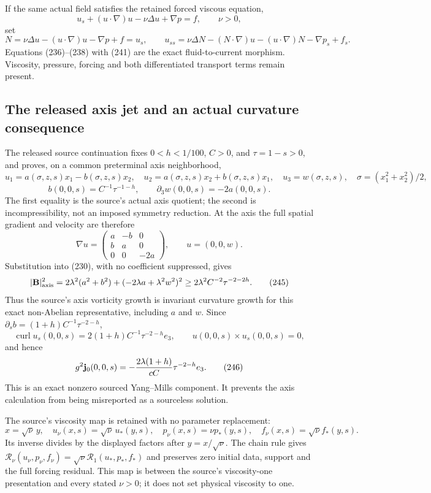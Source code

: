 If the same actual field satisfies the retained forced viscous equation,
\[
 u_s+(u\cdot\nabla)u-\nu\Delta u+\nabla p=f,\qquad \nu>0,
\tag{240}
\]
set
\[
 N=\nu\Delta u-(u\cdot\nabla)u-\nabla p+f=u_s,\qquad
 u_{ss}=\nu\Delta N-(N\cdot\nabla)u-(u\cdot\nabla)N-\nabla p_s+f_s.
\tag{241}
\]
Equations (236)--(238) with (241) are the exact fluid-to-current
morphism. Viscosity, pressure, forcing and both differentiated transport
terms remain present.

\subsection{The released axis jet and an actual curvature consequence}

The released source continuation fixes \(0<h<1/100\), \(C>0\), and
\(\tau=1-s>0\), and proves, on a common preterminal axis neighborhood,
\[
 u_1=a(\sigma,z,s)x_1-b(\sigma,z,s)x_2,\quad
 u_2=a(\sigma,z,s)x_2+b(\sigma,z,s)x_1,\quad
 u_3=w(\sigma,z,s),\quad \sigma=(x_1^2+x_2^2)/2,
\tag{242}
\]
\[
 b(0,0,s)=C^{-1}\tau^{-1-h},\qquad
 \partial_3w(0,0,s)=-2a(0,0,s).
\tag{243}
\]
The first equality is the source's actual axis quotient; the second is
incompressibility, not an imposed symmetry reduction. At the axis the
full spatial gradient and velocity are therefore
\[
 \nabla u=\begin{pmatrix}a&-b&0\\ b&a&0\\0&0&-2a\end{pmatrix},
 \qquad u=(0,0,w).
\tag{244}
\]
Substitution into (230), with no coefficient suppressed, gives
\[
 |{\bf B}|^2_{\rm axis}
 =2\lambda^2(a^2+b^2)+(-2\lambda a+\lambda^2w^2)^2
 \ge 2\lambda^2C^{-2}\tau^{-2-2h}.
\tag{245}
\]
Thus the source's axis vorticity growth is invariant curvature growth for
this exact non-Abelian representative, including \(a\) and \(w\). Since
\(\partial_s b=(1+h)C^{-1}\tau^{-2-h}\),
\[
 \operatorname{curl}u_s(0,0,s)=
 2(1+h)C^{-1}\tau^{-2-h}e_3,\qquad
 u(0,0,s)\times u_s(0,0,s)=0,
\]
and hence
\[
 g^2{\bf j}_0(0,0,s)
 =-\frac{2\lambda(1+h)}{cC}\tau^{-2-h}e_3.
\tag{246}
\]
This is an exact nonzero sourced Yang--Mills component. It prevents the
axis calculation from being misreported as a sourceless solution.

The source's viscosity map is retained with no parameter replacement:
\[
 x=\sqrt{\nu}\,y,\quad
 u_\nu(x,s)=\sqrt{\nu}\,u_*(y,s),\quad
 p_\nu(x,s)=\nu p_*(y,s),\quad f_\nu(x,s)=\sqrt{\nu}f_*(y,s).
\tag{247}
\]
Its inverse divides by the displayed factors after \(y=x/\sqrt{\nu}\).
The chain rule gives
\(\mathcal R_\nu(u_\nu,p_\nu,f_\nu)=
\sqrt{\nu}\mathcal R_1(u_*,p_*,f_*)\) and preserves zero initial data,
support and the full forcing residual. This map is between the source's
viscosity-one presentation and every stated \(\nu>0\); it does not set
physical viscosity to one.

